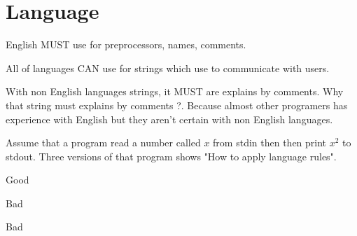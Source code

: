 \chapter{Language}

English MUST use for preprocessors, names, comments.

All of languages CAN use for strings which use to communicate with users.

With non English languages strings, it MUST are explains by comments.
Why that string must explains by comments ?. Because almost other programers
has experience with English but they aren't certain with non English languages.

Assume that a program read a number called $x$ from stdin then then print $x^2$
to stdout. Three versions of that program shows "How to apply language rules".

Good



Bad



Bad


